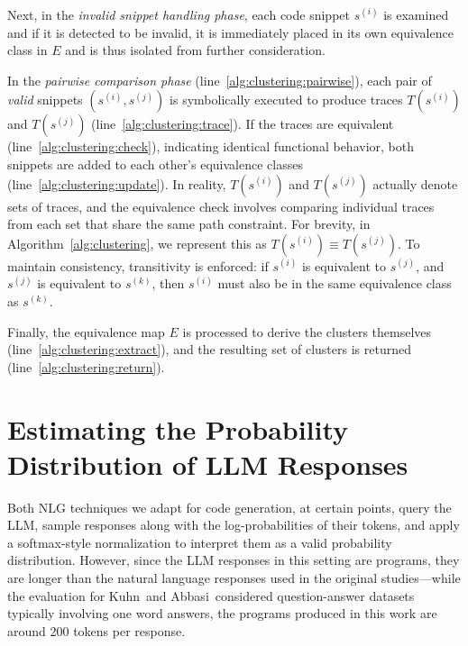 Next, in the \emph{invalid snippet handling phase}, each code snippet $s^{(i)}$ is examined and if it is detected to be invalid, it is immediately placed in its own equivalence class in $E$ and is thus isolated from further consideration. 

In the \emph{pairwise comparison phase} (line~\ref{alg:clustering:pairwise}), each pair of \emph{valid} snippets $(s^{(i)}, s^{(j)})$ is symbolically executed to produce traces $T(s^{(i)})$ and $T(s^{(j)})$ (line~\ref{alg:clustering:trace}). 
If the traces are equivalent (line~\ref{alg:clustering:check}), indicating identical functional behavior, both snippets are added to each other's equivalence classes (line~\ref{alg:clustering:update}). 
In reality, $T(s^{(i)})$ and $T(s^{(j)})$ actually denote sets of traces, and the equivalence check involves comparing individual traces from each set that share the same path constraint.
For brevity, in Algorithm~\ref{alg:clustering}, we represent this as $T(s^{(i)}) \equiv T(s^{(j)})$.
To maintain consistency, transitivity is enforced: if $s^{(i)}$ is equivalent to $s^{(j)}$, and $s^{(j)}$ is equivalent to $s^{(k)}$, then $s^{(i)}$ must also be in the same equivalence class as $s^{(k)}$. 

Finally, the equivalence map $E$ is processed to derive the clusters themselves (line~\ref{alg:clustering:extract}), and the resulting set of clusters is returned (line~\ref{alg:clustering:return}). 

\section{Estimating the Probability Distribution of LLM Responses}
\label{sec:probcomp}

Both NLG techniques we adapt for code generation, at certain points, query the LLM, sample responses along with the log-probabilities of their tokens, and apply a softmax-style normalization to interpret them as a valid probability distribution.
However, since the LLM responses in this setting are programs, they are longer than the natural language responses used in the original studies---while the evaluation for Kuhn~\etal and Abbasi~\etal considered question-answer datasets typically involving one word answers, the programs produced in this work are around 200 tokens per response. 

